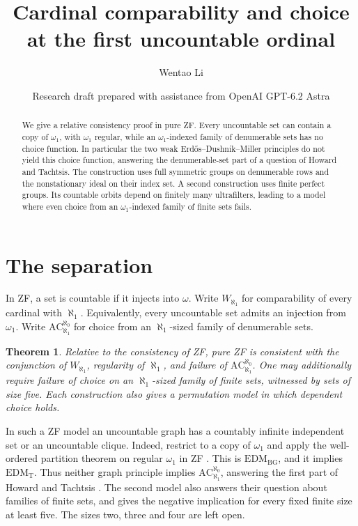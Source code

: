 \documentclass[11pt]{article}
\title{Cardinal comparability and choice at the first uncountable ordinal}
\author{Wentao Li}
\date{Research draft prepared with assistance from OpenAI GPT-6.2 Astra}
\newtheorem{theorem}{Theorem}
\begin{document}
\maketitle
\begin{abstract}
We give a relative consistency proof in pure ZF. Every uncountable set can contain a copy of $\omega_1$, with $\omega_1$ regular, while an $\omega_1$-indexed family of denumerable sets has no choice function. In particular the two weak Erdős--Dushnik--Miller principles do not yield this choice function, answering the denumerable-set part of a question of Howard and Tachtsis. The construction uses full symmetric groups on denumerable rows and the nonstationary ideal on their index set. A second construction uses finite perfect groups. Its countable orbits depend on finitely many ultrafilters, leading to a model where even choice from an $\omega_1$-indexed family of finite sets fails.
\end{abstract}

\section{The separation}
In ZF, a set is countable if it injects into $\omega$. Write $W_{\aleph_1}$ for comparability of every cardinal with $\aleph_1$. Equivalently, every uncountable set admits an injection from $\omega_1$. Write $\mathrm{AC}_{\aleph_1}^{\aleph_0}$ for choice from an $\aleph_1$-sized family of denumerable sets.
\begin{theorem}\label{main}
Relative to the consistency of ZF, pure ZF is consistent with the conjunction of $W_{\aleph_1}$, regularity of $\aleph_1$, and failure of $\mathrm{AC}_{\aleph_1}^{\aleph_0}$. One may additionally require failure of choice on an $\aleph_1$-sized family of finite sets, witnessed by sets of size five. Each construction also gives a permutation model in which dependent choice holds.
\end{theorem}
In such a ZF model an uncountable graph has a countably infinite independent set or an uncountable clique. Indeed, restrict to a copy of $\omega_1$ and apply the well-ordered partition theorem on regular $\omega_1$ in ZF \cite[Proposition 3.3(1)]{bg}. This is $\mathrm{EDM}_{\mathrm{BG}}$, and it implies $\mathrm{EDM}_{\mathrm T}$. Thus neither graph principle implies $\mathrm{AC}_{\aleph_1}^{\aleph_0}$, answering the first part of Howard and Tachtsis \cite[Section 8, Question 4]{ht}. The second model also answers their question about families of finite sets, and gives the negative implication for every fixed finite size at least five. The sizes two, three and four are left open.
\end{document}
